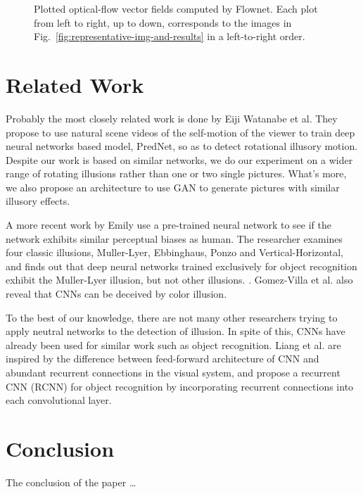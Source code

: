 \documentclass[journal]{IEEEtran}
\begin{document}
\begin{figure}
    \caption{Plotted optical-flow vector fields computed by Flownet. Each plot from left to right, up to down, corresponds to the images in Fig.~\ref{fig:representative-img-and-results} in a left-to-right order.}
    \label{fig:vector-fields}
  \end{figure}
  
  \section{Related Work}
  \label{sec:related}
  
  Probably the most closely related work is done by Eiji Watanabe et al. They propose to use natural scene videos of the self-motion of the viewer to train deep neural networks based model, PredNet, so as to detect rotational illusory motion. \cite{watanable2018illusory} Despite our work is based on similar networks, we do our experiment on a wider range of rotating illusions rather than one or two single pictures. What's more, we also propose an architecture to use GAN to generate pictures with similar illusory effects.
  
  
  A more recent work by Emily use a pre-trained neural network to see if the network exhibits similar perceptual biases as human. The researcher examines four classic illusions,  Muller-Lyer, Ebbinghaus,  Ponzo and Vertical-Horizontal, and finds out that deep neural networks trained exclusively for object recognition exhibit the Muller-Lyer illusion, but not other illusions. \cite{ward2019exploring} . Gomez-Villa et al. also reveal that CNNs can be deceived by color illusion. \cite{gomez2018convolutional} 
  
  To the best of our knowledge, there are not many other researchers trying to apply neutral networks to the detection of illusion. In spite of this, CNNs have already been used for similar work such as object recognition. Liang et al. are inspired by the difference between feed-forward  architecture of CNN and abundant recurrent connections in the visual system, and propose a recurrent CNN (RCNN) for object recognition by incorporating recurrent connections into each convolutional layer.\cite{liang2015recurrent}
  
  \section{Conclusion}
  \label{sec:conclusion}
  
  
  The conclusion of the paper \dots
  
  
  
  
  
  
  
\end{document}
